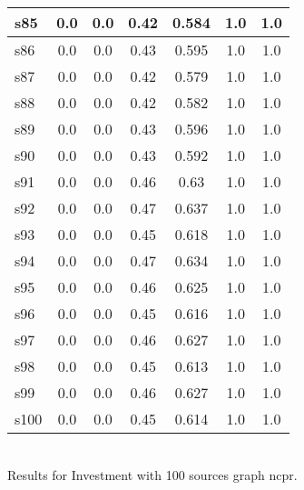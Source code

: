 \documentclass{article}
\begin{document}
\begin{tabular}{|l|c|c|c|c|c|c|}
\hline
s85 &0.0 & 0.0 & 0.42 & 0.584 & 1.0 & 1.0\\
\hline
s86 &0.0 & 0.0 & 0.43 & 0.595 & 1.0 & 1.0\\
\hline
s87 &0.0 & 0.0 & 0.42 & 0.579 & 1.0 & 1.0\\
\hline
s88 &0.0 & 0.0 & 0.42 & 0.582 & 1.0 & 1.0\\
\hline
s89 &0.0 & 0.0 & 0.43 & 0.596 & 1.0 & 1.0\\
\hline
s90 &0.0 & 0.0 & 0.43 & 0.592 & 1.0 & 1.0\\
\hline
s91 &0.0 & 0.0 & 0.46 & 0.63 & 1.0 & 1.0\\
\hline
s92 &0.0 & 0.0 & 0.47 & 0.637 & 1.0 & 1.0\\
\hline
s93 &0.0 & 0.0 & 0.45 & 0.618 & 1.0 & 1.0\\
\hline
s94 &0.0 & 0.0 & 0.47 & 0.634 & 1.0 & 1.0\\
\hline
s95 &0.0 & 0.0 & 0.46 & 0.625 & 1.0 & 1.0\\
\hline
s96 &0.0 & 0.0 & 0.45 & 0.616 & 1.0 & 1.0\\
\hline
s97 &0.0 & 0.0 & 0.46 & 0.627 & 1.0 & 1.0\\
\hline
s98 &0.0 & 0.0 & 0.45 & 0.613 & 1.0 & 1.0\\
\hline
s99 &0.0 & 0.0 & 0.46 & 0.627 & 1.0 & 1.0\\
\hline
s100 &0.0 & 0.0 & 0.45 & 0.614 & 1.0 & 1.0\\
\hline
\end{tabular}\\

\noindent Results for Investment with 100 sources graph ncpr.
\end{document}
